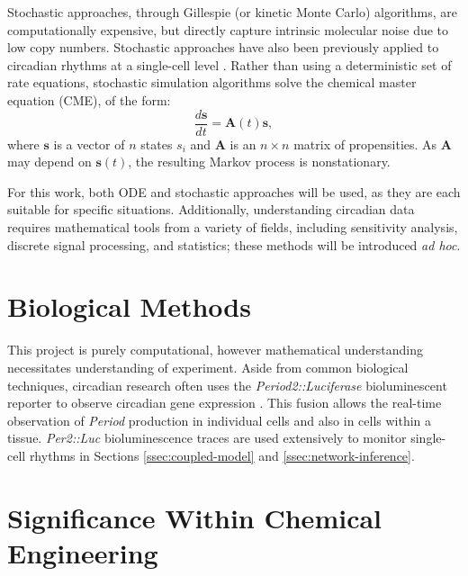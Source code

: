 Stochastic approaches, through Gillespie (or kinetic Monte Carlo) algorithms, are computationally expensive, but directly capture intrinsic molecular noise due to low copy numbers.
Stochastic approaches have also been previously applied to circadian rhythms at a single-cell level \cite{Forger2005, Meeker2011a}.
Rather than using a deterministic set of rate equations, stochastic simulation algorithms solve the chemical master equation (CME), of the form:
\begin{equation}
    \label{eqn:ssa}
    \frac{d\mathbf{s}}{dt} = \mathbf{A}(t)\mathbf{s},
\end{equation}
where $\mathbf{s}$ is a vector of $n$ states $s_i$ and $\mathbf{A}$ is an $n \times n$ matrix of propensities.
As $\mathbf{A}$ may depend on $\mathbf{s}(t)$, the resulting Markov process is nonstationary.

For this work, both ODE and stochastic approaches will be used, as they are each suitable for specific situations.
Additionally, understanding circadian data requires mathematical tools from a variety of fields, including sensitivity analysis, discrete signal processing, and statistics; these methods will be introduced \textit{ad hoc}.

\section{Biological Methods}
This project is purely computational, however mathematical understanding necessitates understanding of experiment.
Aside from common biological techniques, circadian research often uses the \textit{Period2::Luciferase} bioluminescent reporter to observe circadian gene expression \cite{Yoo2004}.
This fusion allows the real-time observation of \textit{Period} production in individual cells and also in cells within a tissue.
\textit{Per2::Luc} bioluminescence traces are used extensively to monitor single-cell rhythms in Sections \ref{ssec:coupled-model} and \ref{ssec:network-inference}.

\section{Significance Within Chemical Engineering}

